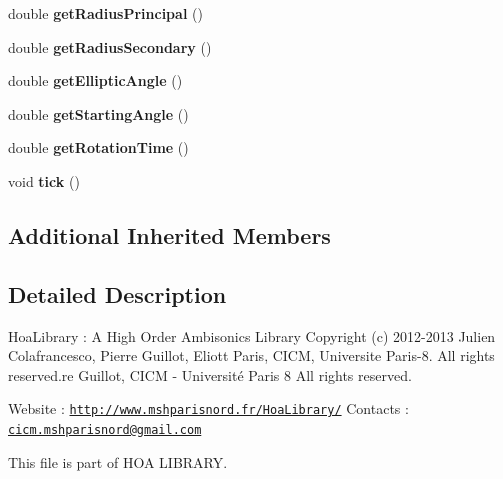 \begin{DoxyCompactItemize}
\item 
\hypertarget{class_satellite_af2f23f7b666dbf9e386d85994384b0f5}{double {\bfseries get\-Radius\-Principal} ()}\label{class_satellite_af2f23f7b666dbf9e386d85994384b0f5}

\item 
\hypertarget{class_satellite_a0758e76c99704e1d8cb952e271abadc1}{double {\bfseries get\-Radius\-Secondary} ()}\label{class_satellite_a0758e76c99704e1d8cb952e271abadc1}

\item 
\hypertarget{class_satellite_a26c4d92baf96f1aa8013f60f11ddb38f}{double {\bfseries get\-Elliptic\-Angle} ()}\label{class_satellite_a26c4d92baf96f1aa8013f60f11ddb38f}

\item 
\hypertarget{class_satellite_a84c7ca20eb293a064204439bcec99a5c}{double {\bfseries get\-Starting\-Angle} ()}\label{class_satellite_a84c7ca20eb293a064204439bcec99a5c}

\item 
\hypertarget{class_satellite_a8c856bd8aff5e287d2f9814aea193608}{double {\bfseries get\-Rotation\-Time} ()}\label{class_satellite_a8c856bd8aff5e287d2f9814aea193608}

\item 
\hypertarget{class_satellite_ab181d393cae5eb8eab264ce690ecfc44}{void {\bfseries tick} ()}\label{class_satellite_ab181d393cae5eb8eab264ce690ecfc44}

\end{DoxyCompactItemize}
\subsection*{Additional Inherited Members}


\subsection{Detailed Description}
Hoa\-Library \-: A High Order Ambisonics Library Copyright (c) 2012-\/2013 Julien Colafrancesco, Pierre Guillot, Eliott Paris, C\-I\-C\-M, Universite Paris-\/8. All rights reserved.\-re Guillot, C\-I\-C\-M -\/ Université Paris 8 All rights reserved.

Website \-: \href{http://www.mshparisnord.fr/HoaLibrary/}{\tt http\-://www.\-mshparisnord.\-fr/\-Hoa\-Library/} Contacts \-: \href{mailto:cicm.mshparisnord@gmail.com}{\tt cicm.\-mshparisnord@gmail.\-com}

This file is part of H\-O\-A L\-I\-B\-R\-A\-R\-Y.

